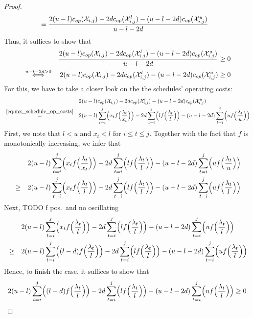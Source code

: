 \begin{proof}
\begin{align*}
	&=\frac{2(u-l)c_{op}(\mathcal{X}_{i,j})-2dc_{op}(\mathcal{X}_{i,j}^l)-(u-l-2d)c_{op}(\mathcal{X}_{i,j}^u)}{u-l-2d}
\end{align*}
Thus, it suffices to show that
\begin{align*}
	&&\frac{2(u-l)c_{op}(\mathcal{X}_{i,j})-2dc_{op}(\mathcal{X}_{i,j}^l)-(u-l-2d)c_{op}(\mathcal{X}_{i,j}^u)}{u-l-2d}&\ge 0\\
	&\stackrel{u-l-2d>0}{\iff}&2(u-l)c_{op}(\mathcal{X}_{i,j})-2dc_{op}(\mathcal{X}_{i,j}^l)-(u-l-2d)c_{op}(\mathcal{X}_{i,j}^u)&\ge 0
\end{align*}
For this, we have to take a closer look on the the schedules' operating costs:
\begin{align*}
	&&&2(u-l)c_{op}(\mathcal{X}_{i,j})-2dc_{op}(\mathcal{X}_{i,j}^l)-(u-l-2d)c_{op}(\mathcal{X}_{i,j}^u)\\
	&\stackrel{\eqref{eq:mx_schedule_op_costs}}{=}&&2(u-l)\sum\limits_{t=i}^j\Bigl(x_tf\Bigl(\frac{\lambda_t}{x_t}\Bigr)\Bigr)-2d\sum\limits_{t=i}^j\Bigl(lf\Bigl(\frac{\lambda_t}{l}\Bigr)\Bigr)-(u-l-2d)\sum\limits_{t=i}^j\Bigl(uf\Bigl(\frac{\lambda_t}{u}\Bigr)\Bigr)
\end{align*}
First, we note that $l<u$ and $x_t<l$ for $i\le t\le j$. Together with the fact that $f$ is monotonically increasing, we infer that
\begin{align*}
	&&&2(u-l)\sum\limits_{t=i}^j\Bigl(x_tf\Bigl(\frac{\lambda_t}{x_t}\Bigr)\Bigr)-2d\sum\limits_{t=i}^j\Bigl(lf\Bigl(\frac{\lambda_t}{l}\Bigr)\Bigr)-(u-l-2d)\sum\limits_{t=i}^j\Bigl(uf\Bigl(\frac{\lambda_t}{u}\Bigr)\Bigr)\\
	&\ge&&2(u-l)\sum\limits_{t=i}^j\Bigl(x_tf\Bigl(\frac{\lambda_t}{l}\Bigr)\Bigr)-2d\sum\limits_{t=i}^j\Bigl(lf\Bigl(\frac{\lambda_t}{l}\Bigr)\Bigr)-(u-l-2d)\sum\limits_{t=i}^j\Bigl(uf\Bigl(\frac{\lambda_t}{l}\Bigr)\Bigr)
\end{align*}
Next, TODO f pos.\ and no oscillating
\begin{align*}
	&&&2(u-l)\sum\limits_{t=i}^j\Bigl(x_tf\Bigl(\frac{\lambda_t}{l}\Bigr)\Bigr)-2d\sum\limits_{t=i}^j\Bigl(lf\Bigl(\frac{\lambda_t}{l}\Bigr)\Bigr)-(u-l-2d)\sum\limits_{t=i}^j\Bigl(uf\Bigl(\frac{\lambda_t}{l}\Bigr)\Bigr)\\
	&\ge&&2(u-l)\sum\limits_{t=i}^j\Bigl((l-d)f\Bigl(\frac{\lambda_t}{l}\Bigr)\Bigr)-2d\sum\limits_{t=i}^j\Bigl(lf\Bigl(\frac{\lambda_t}{l}\Bigr)\Bigr)-(u-l-2d)\sum\limits_{t=i}^j\Bigl(uf\Bigl(\frac{\lambda_t}{l}\Bigr)\Bigr)
\end{align*}
Hence, to finish the case, it suffices to show that
\begin{align*}
	2(u-l)\sum\limits_{t=i}^j\Bigl((l-d)f\Bigl(\frac{\lambda_t}{l}\Bigr)\Bigr)-2d\sum\limits_{t=i}^j\Bigl(lf\Bigl(\frac{\lambda_t}{l}\Bigr)\Bigr)-(u-l-2d)\sum\limits_{t=i}^j\Bigl(uf\Bigl(\frac{\lambda_t}{l}\Bigr)\Bigr)\ge 0

\end{align*}
\end{proof}
